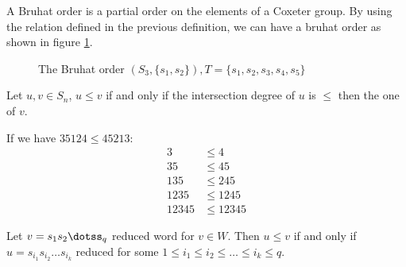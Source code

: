 A Bruhat order is a partial order on the elements of a Coxeter group. By using the relation defined in the previous definition, we can have a bruhat order as shown in figure \ref{fig:bruhat}.

\begin{figure}
\begin{center}

\end{center}
\caption{The Bruhat order $(S_3, \{s_1, s_2\}), T = \{s_1,s_2,s_3,s_4,s_5\}$}
\label{fig:bruhat}
\end{figure}


\begin{theorem}
  Let $u,v \in S_n$, $u \leq v$ if and only if the intersection degree of $u$ is $\leq$ then the one of $v$.
\end{theorem}

\begin{example}
  If we have $35124 \leq 45213$:
  \begin{equation}
    \begin{split}
      3 &\leq 4\\
      35 &\leq 45\\
      135 &\leq 245\\
      1235 &\leq 1245\\
      12345 &\leq 12345
    \end{split}
  \end{equation}
\end{example}

\begin{theorem} 
  Let $v = s_1s_2\dotss_q$ reduced word for $v \in W$. Then $u \leq v$ if and only if $u = s_{i_1}s_{i_2} \dots s_{i_k}$ reduced for some $1 \leq i_1 \leq i_2 \leq \dots \leq i_k \leq q$.
\end{theorem}

